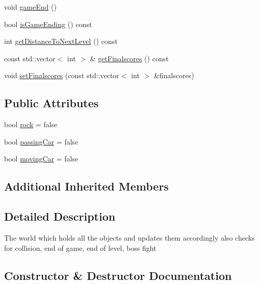 \begin{DoxyCompactItemize}
\item 
void \hyperlink{classroadfighter_1_1World_a543b7c682003fb1cee2f51f093bf75ea}{game\+End} ()
\item 
bool \hyperlink{classroadfighter_1_1World_a813e7853ec9c47bc741ac79e6098f3e1}{is\+Game\+Ending} () const
\item 
int \hyperlink{classroadfighter_1_1World_a0f0dde0c7b4dedc0bf71136cde4f1b4d}{get\+Distance\+To\+Next\+Level} () const
\item 
const std\+::vector$<$ int $>$ \& \hyperlink{classroadfighter_1_1World_a64feef41674e319b5a39e984eb9ddc4c}{get\+Finalscores} () const
\item 
void \hyperlink{classroadfighter_1_1World_a8cbfe6306f4c9f0883aed112d9b1609d}{set\+Finalscores} (const std\+::vector$<$ int $>$ \&finalscores)
\end{DoxyCompactItemize}
\subsection*{Public Attributes}
\begin{DoxyCompactItemize}
\item 
bool \hyperlink{classroadfighter_1_1World_a141a64ca5d10b4cc1fcb0a055b4a1fd4}{rock} = false
\item 
bool \hyperlink{classroadfighter_1_1World_a64fd62cdc0a679e6cb4aa7269bcf4a21}{passing\+Car} = false
\item 
bool \hyperlink{classroadfighter_1_1World_a34349d637e9d7c8c30ad45374e99a52a}{moving\+Car} = false
\end{DoxyCompactItemize}
\subsection*{Additional Inherited Members}


\subsection{Detailed Description}
The world which holds all the objects and updates them accordingly also checks for collision, end of game, end of level, boss fight 

\subsection{Constructor \& Destructor Documentation}
\mbox{\label{classroadfighter_1_1World_a4a099b8b3dde5d25daa4d9f778b0342c}} 
